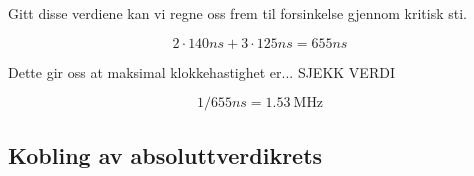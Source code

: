 Gitt disse verdiene kan vi regne oss frem til forsinkelse gjennom kritisk sti.

\begin{displaymath}
  2 \cdot 140ns + 3 \cdot 125ns = 655ns
\end{displaymath}

Dette gir oss at maksimal klokkehastighet er... SJEKK VERDI

\begin{displaymath} %
  1/655ns = \SI{1.53}{\mega\hertz}
\end{displaymath}

\clearpage

\subsection{Kobling av absoluttverdikrets}

